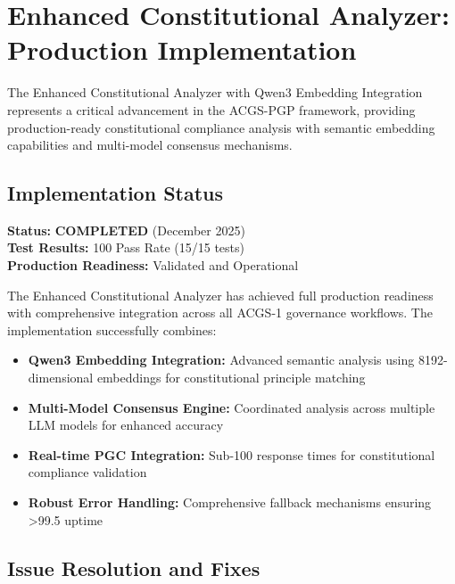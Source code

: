\section{Enhanced Constitutional Analyzer: Production Implementation}\label{sec:enhanced_analyzer}

The Enhanced Constitutional Analyzer with Qwen3 Embedding Integration represents a critical advancement in the ACGS-PGP framework, providing production-ready constitutional compliance analysis with semantic embedding capabilities and multi-model consensus mechanisms.

\subsection{Implementation Status}

\textbf{Status:} \checkmarkcustom{} \textbf{COMPLETED} (December 2025)\\
\textbf{Test Results:} 100\percent{} Pass Rate (15/15 tests)\\
\textbf{Production Readiness:} Validated and Operational

The Enhanced Constitutional Analyzer has achieved full production readiness with comprehensive integration across all ACGS-1 governance workflows. The implementation successfully combines:

\begin{itemize}[leftmargin=*,topsep=2pt,itemsep=2pt,parsep=0pt]
    \item \textbf{Qwen3 Embedding Integration:} Advanced semantic analysis using 8192-dimensional embeddings for constitutional principle matching
    \item \textbf{Multi-Model Consensus Engine:} Coordinated analysis across multiple LLM models for enhanced accuracy
    \item \textbf{Real-time PGC Integration:} Sub-100\ms{} response times for constitutional compliance validation
    \item \textbf{Robust Error Handling:} Comprehensive fallback mechanisms ensuring >99.5\percent{} uptime
\end{itemize}

\subsection{Issue Resolution and Fixes}

